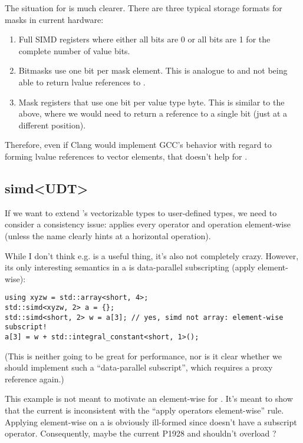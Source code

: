 The situation for \mask is much clearer.
There are three typical storage formats for masks in current hardware:
\begin{enumerate}
  \item Full SIMD registers where either all bits are 0 or all bits are 1 for
    the complete number of value bits.
  \item Bitmasks use one bit per mask element.
    This is analogue to  and  not being able to
    return lvalue references to .
  \item Mask registers that use one bit per value type byte.
    This is similar to the above, where we would need to return a reference to
    a single bit (just at a different position).
\end{enumerate}
Therefore, even if Clang would implement GCC's behavior with regard to forming
lvalue references to vector elements, that doesn't help for \mask.

\subsection{simd<UDT>}\label{sec:simd<array>}
If we want to extend \simd's vectorizable types to user-defined types, we need
to consider a consistency issue:
 applies every operator and operation element-wise (unless the
name clearly hints at a horizontal operation).

While I don't think e.g.  is a useful thing,
it's also not completely crazy.
However, its only interesting semantics in a \simd is data-parallel
subscripting (apply  element-wise):
\medskip\begin{lstlisting}[style=Vc]
using xyzw = std::array<short, 4>;
std::simd<xyzw, 2> a = {};
std::simd<short, 2> w = a[3]; // yes, simd not array: element-wise subscript!
a[3] = w + std::integral_constant<short, 1>();
\end{lstlisting}

(This is neither going to be great for performance, nor is it clear whether we
should implement such a “data-parallel subscript”, which requires a proxy
reference again.)

This example is not meant to motivate an element-wise  for .
It's meant to show that the current  is inconsistent
with the “apply operators element-wise” rule.
Applying  element-wise on a  is obviously
ill-formed since  doesn't have a subscript operator.
Consequently, maybe the current P1928 \simd and \mask shouldn't overload
?



